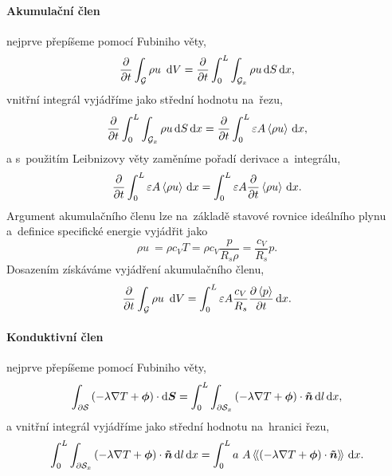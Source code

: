 \paragraph{Akumulační člen} nejprve přepíšeme pomocí Fubiniho věty,
\begin{equation}
    \frac{\partial }{\partial t}\int_{\mathcal{G}}\rho u~\,\mathrm{d}{V}
    =\frac{\partial }{\partial t}\int_0^L\int_{\mathcal{G}_x}\rho u\,\mathrm{d}{S}\,\mathrm{d}{x},
\end{equation}
vnitřní integrál vyjádříme jako střední hodnotu na~řezu,
\begin{equation}
    \frac{\partial }{\partial t}\int_0^L\int_{\mathcal{G}_x}\rho u\,\mathrm{d}{S}\,\mathrm{d}{x}
    =\frac{\partial }{\partial t}\int_0^L\varepsilon A\left\langle\rho u\right\rangle\,\mathrm{d}{x},
\end{equation}
a s~použitím Leibnizovy věty zaměníme pořadí derivace a~integrálu,
\begin{equation}
    \frac{\partial }{\partial t}\int_0^L\varepsilon A\left\langle\rho u\right\rangle\,\mathrm{d}{x}=\int_0^L\varepsilon A\frac{\partial }{\partial t}\left\langle\rho u\right\rangle\,\mathrm{d}{x}.
\end{equation}  
Argument akumulačního členu lze na~základě stavové rovnice ideálního plynu a~definice specifické energie vyjádřit jako
\begin{equation}
    \rho u~= \rho c_V T = \rho c_V \frac{p}{R_s \rho}=\frac{c_V}{R_s}p.
\end{equation}
Dosazením získáváme vyjádření akumulačního členu,
\begin{equation}\label{eq:accumulation_mean}
    \frac{\partial }{\partial t}\int_{\mathcal{G}}\rho u~\,\mathrm{d}{V}=\int_0^L\varepsilon A\frac{c_V}{R_s}\frac{\partial \left\langle p\right\rangle}{\partial t}\,\mathrm{d}{x}.
\end{equation}

\paragraph{Konduktivní člen} nejprve přepíšeme pomocí Fubiniho věty,
\begin{equation}
    \int_{\partial\mathcal{S}}\left(-\lambda \nabla T + \bm{\phi}\right)\cdot\mathrm{d}\bm{S}=
    \int_0^L \int_{\partial\mathcal{S}_x}\left(-\lambda \nabla T + \bm{\phi}\right)\cdot\bm{\tilde{n}}\,\mathrm{d}{l}\,\mathrm{d}{x},
\end{equation}
a vnitřní integrál vyjádříme jako střední hodnotu na~hranici řezu,
\begin{equation}\label{eq:conduction_mean}
    \int_0^L \int_{\partial\mathcal{S}_x}\left(-\lambda \nabla T + \bm{\phi}\right)\cdot\bm{\tilde{n}}\,\mathrm{d}{l}\,\mathrm{d}{x}=
    \int_0^L a~A \left\langle\!\left\langle \left(-\lambda \nabla T + \bm{\phi}\right)\cdot\bm{\tilde{n}} \right\rangle\!\right\rangle\,\mathrm{d}{x}.
\end{equation}

